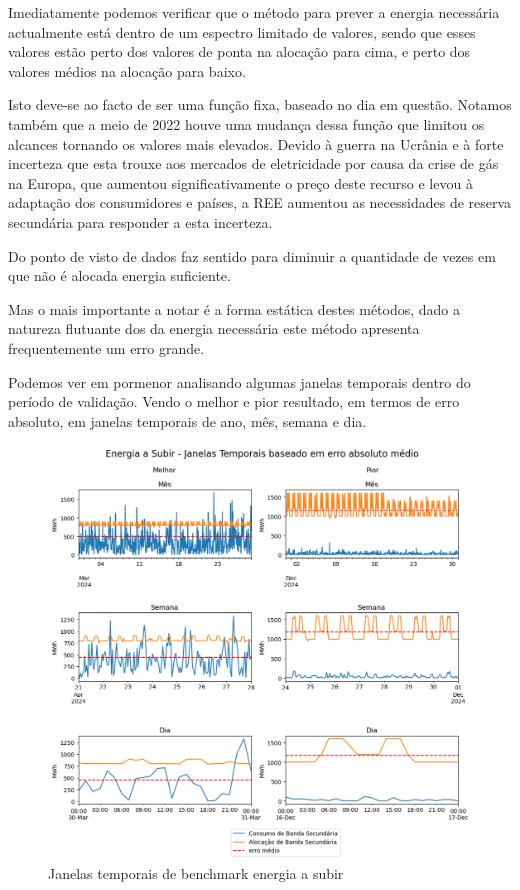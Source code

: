 Imediatamente podemos verificar que o método para prever a energia necessária actualmente está dentro de um espectro limitado de valores, sendo que esses valores estão perto dos valores de ponta na alocação para cima, e perto dos valores médios na alocação para baixo.\par
Isto deve-se ao facto de ser uma função fixa, baseado no dia em questão. Notamos também que a meio de 2022 houve uma mudança dessa função que limitou os alcances tornando os valores mais elevados. Devido à guerra na Ucrânia e à forte incerteza que esta trouxe aos mercados de eletricidade por causa da crise de gás na Europa, que aumentou significativamente o preço deste recurso e levou à adaptação dos consumidores e países, a \gls{REE} aumentou as necessidades de reserva secundária para responder a esta incerteza.\par
Do ponto de visto de dados faz sentido para diminuir a quantidade  de vezes em que não é alocada energia suficiente.\par
Mas o mais importante a notar é a forma estática destes métodos, dado a natureza flutuante dos da energia necessária este método apresenta frequentemente um erro grande.\par
Podemos ver em pormenor analisando algumas janelas temporais dentro do período de validação. Vendo o melhor e pior resultado, em termos de erro absoluto, em janelas temporais de ano, mês, semana e dia.\par


\begin{figure}[H]
    \centering
    \includegraphics[width=\textwidth]{plots/alocacoes_temporais_upward_dataset.png}
    \caption{Janelas temporais de benchmark energia a subir}
    \label{fig:benchmarktimewindowsup}
\end{figure}



